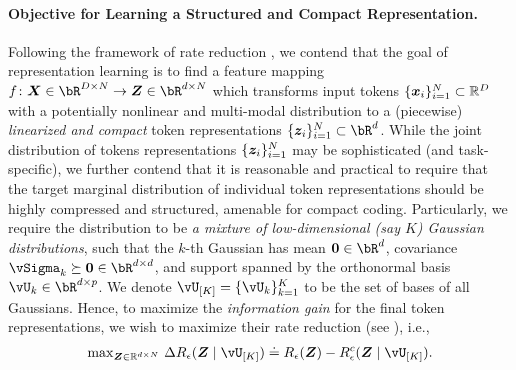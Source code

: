 \documentclass[\toplevelprefix/book-main.tex]{subfiles}
\begin{document}
 
\paragraph{Objective for Learning a Structured and Compact Representation.}
Following the framework of rate reduction , we contend
that the goal of representation learning is to find a feature mapping \(f
\colon \X \in \bR^{D \times N} \to \Z\in \bR^{d \times N}\) which transforms input tokens \(\{\bm x_i\}_{i=1}^N \subset \mathbb{R}^D\) with a potentially nonlinear and multi-modal distribution to a (piecewise) \textit{linearized and compact} token representations \(\{\bm z_i\}_{i=1}^N \subset \bR^{d}\). While the joint distribution of tokens representations \(\{\bm{z}_{i}\}_{i = 1}^{N}\) may be sophisticated (and task-specific), we further contend that it is reasonable and practical to
require that the target marginal distribution of individual token representations should be highly compressed and structured, amenable for compact coding. Particularly, we require the distribution to be \textit{a mixture of low-dimensional (say \(K\)) Gaussian
distributions}, such that the \(k\)-th Gaussian has mean \(\Zero \in \bR^{d}\), covariance \(\vSigma_{k} \succeq \Zero \in \bR^{d \times d}\), and support spanned by the orthonormal basis \(\vU_{k} \in \bR^{d \times p}\). 
We denote $\vU_{[K]} = \{\vU_k\}_{k=1}^K$ to be the set of bases of all Gaussians. Hence, to maximize the \textit{information gain} \cite{ma2022principles} for the final token representations, we wish to maximize their rate reduction (see ), i.e., 
\begin{align}\label{eq:rate reduction}
    \mathrm{max}_{\bm Z \in \R^{d\times N}}\ \Delta R_{\epsilon}(\Z \mid \vU_{[K]}) \doteq R_{\epsilon}(\Z) - R^c_{\epsilon}(\Z \mid \vU_{[K]}).
\end{align}
\end{document}
